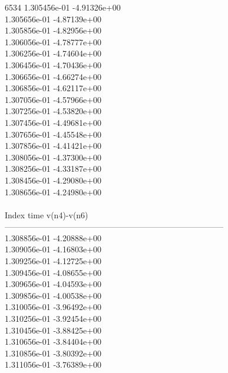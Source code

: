 6534	1.305456e-01	-4.91326e+00	\\ 	1.305656e-01	-4.87139e+00	\\ 	1.305856e-01	-4.82956e+00	\\ 	1.306056e-01	-4.78777e+00	\\ 	1.306256e-01	-4.74604e+00	\\ 	1.306456e-01	-4.70436e+00	\\ 	1.306656e-01	-4.66274e+00	\\ 	1.306856e-01	-4.62117e+00	\\ 	1.307056e-01	-4.57966e+00	\\ 	1.307256e-01	-4.53820e+00	\\ 	1.307456e-01	-4.49681e+00	\\ 	1.307656e-01	-4.45548e+00	\\ 	1.307856e-01	-4.41421e+00	\\ 	1.308056e-01	-4.37300e+00	\\ 	1.308256e-01	-4.33187e+00	\\ 	1.308456e-01	-4.29080e+00	\\ 	1.308656e-01	-4.24980e+00	\\ \hline
\\ \hline
Index   time            v(n4)-v(n6)     \\ \hline
--------------------------------------------------------------------------------\\ 	1.308856e-01	-4.20888e+00	\\ 	1.309056e-01	-4.16803e+00	\\ 	1.309256e-01	-4.12725e+00	\\ 	1.309456e-01	-4.08655e+00	\\ 	1.309656e-01	-4.04593e+00	\\ 	1.309856e-01	-4.00538e+00	\\ 	1.310056e-01	-3.96492e+00	\\ 	1.310256e-01	-3.92454e+00	\\ 	1.310456e-01	-3.88425e+00	\\ 	1.310656e-01	-3.84404e+00	\\ 	1.310856e-01	-3.80392e+00	\\ 	1.311056e-01	-3.76389e+00	\\ \hline
